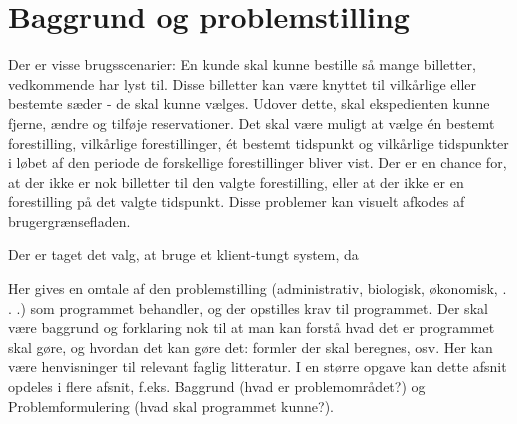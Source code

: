 \chapter{Baggrund og problemstilling}



Der er visse brugsscenarier: En kunde skal kunne bestille så mange billetter, vedkommende har lyst til. Disse billetter kan være knyttet til vilkårlige eller bestemte sæder - de skal kunne vælges. Udover dette, skal ekspedienten kunne fjerne, ændre og tilføje reservationer. Det skal være muligt at vælge én bestemt forestilling, vilkårlige forestillinger, ét bestemt tidspunkt og vilkårlige tidspunkter i løbet af den periode de forskellige forestillinger bliver vist.
Der er en chance for, at der ikke er nok billetter til den valgte forestilling, eller at der ikke er en forestilling på det valgte tidspunkt. Disse problemer kan visuelt afkodes af brugergrænsefladen.



Der er taget det valg, at bruge et klient-tungt system, da 



Her gives en omtale af den problemstilling (administrativ, biologisk, økonomisk, . . .) som programmet
behandler, og der opstilles krav til programmet. Der skal være baggrund og forklaring nok til at man kan
forstå hvad det er programmet skal gøre, og hvordan det kan gøre det: formler der skal beregnes, osv. Her
kan være henvisninger til relevant faglig litteratur.
I en større opgave kan dette afsnit opdeles i flere afsnit, f.eks. Baggrund (hvad er problemområdet?) og
Problemformulering (hvad skal programmet kunne?).